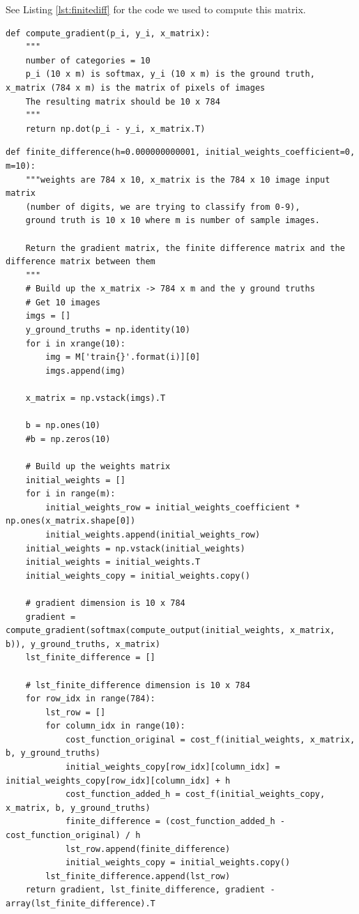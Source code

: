 \documentclass[10pt,letterpaper]{article}
\begin{document}
	See Listing \ref{lst:finitediff} for the code we used to compute this matrix.
	\begin{lstlisting}[label=lst:gradient]
def compute_gradient(p_i, y_i, x_matrix):
    """
    number of categories = 10
    p_i (10 x m) is softmax, y_i (10 x m) is the ground truth, x_matrix (784 x m) is the matrix of pixels of images
    The resulting matrix should be 10 x 784
    """
    return np.dot(p_i - y_i, x_matrix.T)
	\end{lstlisting}
	\begin{lstlisting}[label=lst:finitediff]
def finite_difference(h=0.000000000001, initial_weights_coefficient=0, m=10):
    """weights are 784 x 10, x_matrix is the 784 x 10 image input matrix
    (number of digits, we are trying to classify from 0-9),
    ground truth is 10 x 10 where m is number of sample images.

    Return the gradient matrix, the finite difference matrix and the difference matrix between them
    """
    # Build up the x_matrix -> 784 x m and the y ground truths
    # Get 10 images
    imgs = []
    y_ground_truths = np.identity(10)
    for i in xrange(10):
        img = M['train{}'.format(i)][0]
        imgs.append(img)

    x_matrix = np.vstack(imgs).T

    b = np.ones(10)
    #b = np.zeros(10)

    # Build up the weights matrix
    initial_weights = []
    for i in range(m):
        initial_weights_row = initial_weights_coefficient * np.ones(x_matrix.shape[0])
        initial_weights.append(initial_weights_row)
    initial_weights = np.vstack(initial_weights)
    initial_weights = initial_weights.T
    initial_weights_copy = initial_weights.copy()

    # gradient dimension is 10 x 784
    gradient = compute_gradient(softmax(compute_output(initial_weights, x_matrix, b)), y_ground_truths, x_matrix)
    lst_finite_difference = []

    # lst_finite_difference dimension is 10 x 784
    for row_idx in range(784):
        lst_row = []
        for column_idx in range(10):
            cost_function_original = cost_f(initial_weights, x_matrix, b, y_ground_truths)
            initial_weights_copy[row_idx][column_idx] = initial_weights_copy[row_idx][column_idx] + h
            cost_function_added_h = cost_f(initial_weights_copy, x_matrix, b, y_ground_truths)
            finite_difference = (cost_function_added_h - cost_function_original) / h
            lst_row.append(finite_difference)
            initial_weights_copy = initial_weights.copy()
        lst_finite_difference.append(lst_row)
    return gradient, lst_finite_difference, gradient - array(lst_finite_difference).T
	\end{lstlisting}
\end{document}
